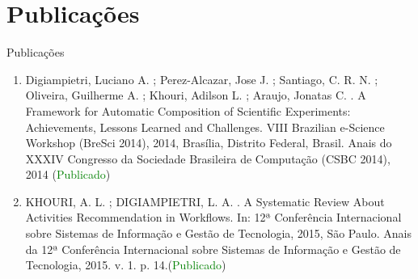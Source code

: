 \section{Publicações}

\begin{frame}
	\begin{block}{Publicações}
		\begin{enumerate}
			
			\item Digiampietri, Luciano A. ; Perez-Alcazar, Jose J. ; Santiago, C. R. N. ; Oliveira, Guilherme A. ; Khouri, Adilson L. ; Araujo, Jonatas C. . A Framework for Automatic Composition of Scientific Experiments: Achievements, Lessons Learned and Challenges. VIII Brazilian e-Science Workshop (BreSci 2014), 2014, Brasília, Distrito Federal, Brasil. Anais do XXXIV Congresso da Sociedade Brasileira de Computação (CSBC 2014), 2014 (\textcolor{green}{Publicado})
			
			\item  KHOURI, A. L. ; DIGIAMPIETRI, L. A. . A Systematic Review About Activities Recommendation in Workflows. In: 12ª Conferência Internacional sobre Sistemas de Informação e Gestão de Tecnologia, 2015, São Paulo. Anais da 12ª Conferência Internacional sobre Sistemas de Informação e Gestão de Tecnologia, 2015. v. 1. p. 14.(\textcolor{green}{Publicado})
			
		\end{enumerate}
		
	\end{block}
\end{frame}

